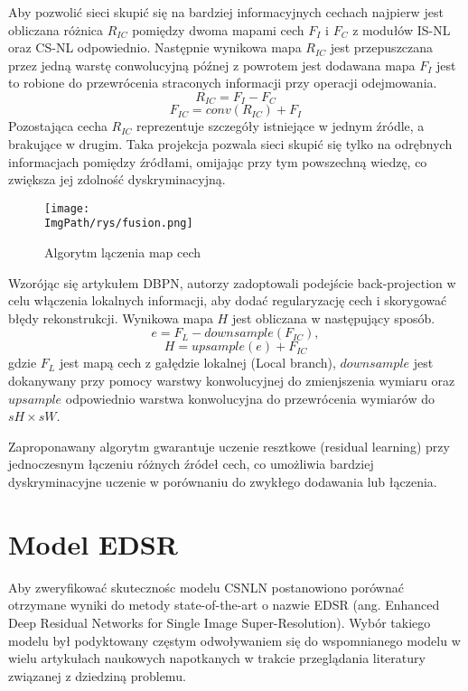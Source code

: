 \documentclass[a4paper,12pt,twoside,openany]{report}
\newcommand{\ImgPath}{.}
\begin{document}
	Aby pozwolić sieci skupić się na bardziej informacyjnych cechach najpierw jest obliczana różnica $R_{IC}$ pomiędzy dwoma mapami cech $F_I$ i $F_C$  z modułów  IS-NL oraz CS-NL odpowiednio. Następnie wynikowa mapa $R_{IC}$ jest przepuszczana przez jedną warstę conwolucyjną późnej z powrotem jest dodawana mapa $F_I$ jest to robione do przewrócenia straconych informacji przy operacji odejmowania.
	\begin{equation}
		R_{IC}  = F_I - F_C
		\label{RIC}
	\end{equation}
	\begin{equation}
		F_{IC} = conv(R_{IC}) + F_I
 		\label{FIC}
	\end{equation}
	Pozostająca cecha $R_{IC}$ reprezentuje szczegóły istniejące w jednym źródle, a brakujące w drugim. Taka projekcja pozwala sieci skupić się tylko na odrębnych informacjach pomiędzy źródłami, omijając przy tym powszechną wiedzę, co zwiększa jej zdolność dyskryminacyjną.
	\begin{figure}[!htbp]
		\begin{center}
			\centering
			\texttt{[image: \\ImgPath/rys/fusion.png]}
		\end{center}
		\caption{Algorytm lączenia map cech}
		\label{Fusion}
	\end{figure} 
	
	Wzorójąc się artykułem DBPN, autorzy zadoptowali podejście back-projection w celu włączenia lokalnych informacji, aby dodać regularyzację cech i skorygować błędy rekonstrukcji. Wynikowa mapa $H$ jest obliczana w następujący sposób. 
	\begin{equation}
		e = F_L - downsample(F_{IC}),
		\label{RIC}
	\end{equation}
	\begin{equation}
		H = upsample(e) + F_{IC}
		\label{FIC}
	\end{equation}
	gdzie $F_L$ jest mapą cech z gałędzie lokalnej (Local branch), $downsample$ jest dokanywany przy pomocy warstwy konwolucyjnej do zmienjszenia wymiaru oraz $upsample$ odpowiednio warstwa konwolucyjna do przewrócenia wymiarów do $sH \times sW$. 
	
	Zaproponawany algorytm gwarantuje uczenie resztkowe (residual learning) przy jednoczesnym łączeniu różnych źródeł cech, co umożliwia bardziej dyskryminacyjne uczenie w porównaniu do zwykłego dodawania lub łączenia.
\newpage
\section{Model EDSR}
Aby zweryfikować skutecznośc modelu CSNLN postanowiono porównać otrzymane wyniki do metody state-of-the-art o nazwie EDSR (ang. Enhanced Deep Residual Networks for Single Image Super-Resolution). Wybór takiego modelu był podyktowany częstym odwoływaniem się do wspomnianego modelu w wielu artykułach naukowych napotkanych w trakcie przeglądania literatury związanej z dziedziną problemu.
\end{document}
